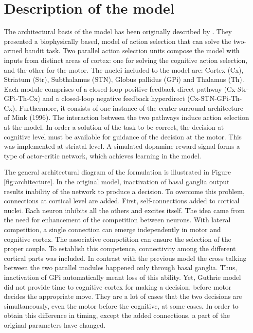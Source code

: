 \section{Description of the model}

	The architectural basis of the model has been originally described by \citet{Guthrie2013}. They presented a biophysically based, model of action selection that can solve the two-armed bandit task. Two parallel action selection units compose the model with inputs from distinct areas of cortex: one for solving the cognitive action selection, and the other for the motor. The nuclei included to the model are: Cortex (Cx), Striatum (Str), Subthalamus (STN), Globus pallidus (GPi) and Thalamus (Th). Each module comprises of a closed-loop positive feedback direct pathway (Cx-Str-GPi-Th-Cx) and a closed-loop negative feedback hyperdirect (Cx-STN-GPi-Th-Cx). Furthermore, it consists of one instance of the center-surround architecture of Mink (1996). The interaction between the two pathways induce action selection at the model. In order a solution of the task to be correct, the decision at  cognitive level must be available for guidance of the decision at the motor. This was implemented at striatal level. A simulated dopamine reward signal forms a type of actor-critic network, which achieves learning in the model.

	The general architectural diagram of the formulation is illustrated in Figure \ref{fig:architecture}. In the original model, inactivation of basal ganglia output results inability of the network to produce a decision. To overcome this problem, connections at cortical level are added. 
	First, self-connections added to cortical nuclei. Each neuron inhibits all the others and excites itself. The idea came from the need for enhancement of the competition between neurons.
	 With lateral competition, a single connection can emerge independently in motor and cognitive cortex. The associative competition  can ensure the selection of the proper couple. To establish this competence, connectivity 	among the different cortical parts was included. In contrast with the previous model the cross talking between the two parallel modules happened only through basal ganglia. Thus, inactivation of GPi automatically meant loss of this ability. 
	Yet,  Guthrie model did not provide time to cognitive cortex for making a decision, before motor  decides the appropriate move. They are a lot of cases that the two decisions are simultaneously, even the motor before the cognitive, at some cases. In order to obtain this difference in timing, except the added connections, a part of the original parameters have changed. 
	
